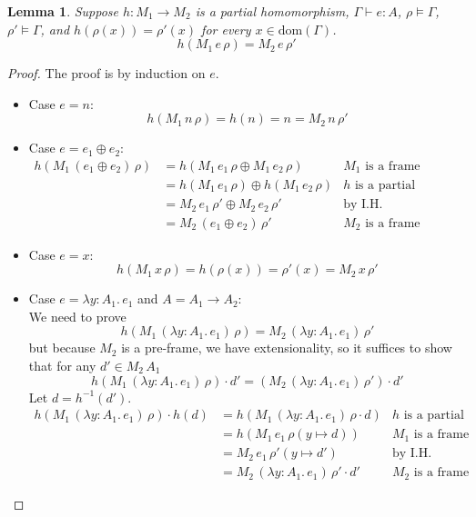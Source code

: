 \documentclass{tufte-handout}
\newcommand{\LAM}[1]{\lambda #1.\,}
\newcommand{\of}[0]{\!:\!}
\newcommand{\ext}[3]{#3(#1{\mapsto}#2)}
\newtheorem{lemma}[theorem]{Lemma}
\begin{document}
\begin{lemma}
\label{lem:homo-equal}
  Suppose $h : M_1 \to M_2$ is a partial homomorphism, $\Gamma \vdash
  e : A$, $\rho \models \Gamma$, $\rho' \models \Gamma$, and
  $h(\rho(x)) = \rho'(x)$ for every $x \in \mathrm{dom}(\Gamma)$.
  \[
    h(M_1\,e\,\rho) = M_2\,e\,\rho'
  \]
\end{lemma}
\begin{proof}
  The proof is by induction on $e$.
  \begin{itemize}
  \item Case $e=n$:\\
    \[
    h(M_1\,n\,\rho) = h(n) = n = M_2\,n\,\rho'
    \]
  \item Case $e=e_1 \oplus e_2$:
    \begin{align*}
    h(M_1\,(e_1 \oplus e_2)\,\rho) 
    &= h(M_1\,e_1\,\rho \oplus M_1\,e_2\,\rho) & \text{$M_1$ is a frame} \\
    &= h(M_1\,e_1\,\rho) \oplus h(M_1\,e_2\,\rho) & \text{$h$ is a partial homomorphism}\\
    &= M_2\,e_1\,\rho' \oplus M_2\,e_2\,\rho' & \text{by I.H.}\\
    &= M_2\,(e_1 \oplus e_2)\,\rho' & \text{$M_2$ is a frame}
    \end{align*}

  \item Case $e=x$:
    \[
      h(M_1\,x\,\rho) = h(\rho(x)) = \rho'(x) = M_2\,x\,\rho'
    \]
  \item Case $e=\LAM{y \of A_1} e_1$ and $A = A_1 \to A_2$: \\
    We need to prove
    \[
    h(M_1\,(\LAM{y \of A_1} e_1)\,\rho) = M_2\,(\LAM{y \of A_1} e_1)\,\rho'
    \]
    but because $M_2$ is a pre-frame, we have extensionality, so it suffices to
    show that for any $d' \in M_2\,A_1$
    \[
    h(M_1\,(\LAM{y \of A_1} e_1)\,\rho) \cdot d' = (M_2\,(\LAM{y \of A_1} e_1)\,\rho') \cdot d'
    \]
    Let $d = h^{-1}(d')$. 
    \begin{align*}
      h(M_1\,(\LAM{y \of A_1} e_1)\,\rho) \cdot h(d)
      &= h(M_1\,(\LAM{y \of A_1} e_1)\,\rho \cdot d) & \text{$h$ is a partial homomorphism}\\
      &= h(M_1\,e_1\,\ext{y}{d}{\rho}) & \text{$M_1$ is a frame}\\
      &= M_2\,e_1\,\ext{y}{d'}{\rho'} & \text{by I.H.} \\
      &= M_2\,(\LAM{y \of A_1} e_1)\,\rho' \cdot d' & \text{$M_2$ is a frame}
    \end{align*}
    

\end{itemize}
\end{proof}
\end{document}
